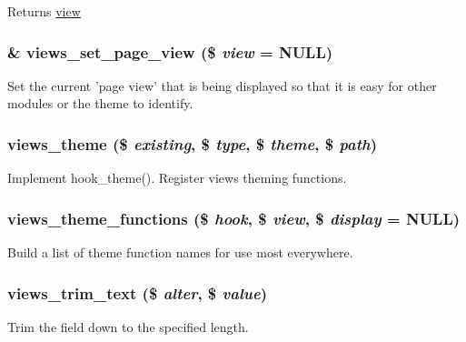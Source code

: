 \begin{DoxyReturn}{Returns}
\hyperlink{classview}{view} 
\end{DoxyReturn}
\hypertarget{views_8module_a71f9684b8a0e7aae0871333881fc06c7}{
\subsubsection[{views\_\-set\_\-page\_\-view}]{\setlength{\rightskip}{0pt plus 5cm}\& views\_\-set\_\-page\_\-view (\$ {\em view} = {\ttfamily NULL})}}
\label{views_8module_a71f9684b8a0e7aae0871333881fc06c7}
Set the current 'page view' that is being displayed so that it is easy for other modules or the theme to identify. \hypertarget{views_8module_aff7ae737313bb2250e6c27f9ca520627}{
\subsubsection[{views\_\-theme}]{\setlength{\rightskip}{0pt plus 5cm}views\_\-theme (\$ {\em existing}, \/  \$ {\em type}, \/  \$ {\em theme}, \/  \$ {\em path})}}
\label{views_8module_aff7ae737313bb2250e6c27f9ca520627}
Implement hook\_\-theme(). Register views theming functions. \hypertarget{views_8module_a5c5e28542b853cf61c0540d05d057e40}{
\subsubsection[{views\_\-theme\_\-functions}]{\setlength{\rightskip}{0pt plus 5cm}views\_\-theme\_\-functions (\$ {\em hook}, \/  \$ {\em view}, \/  \$ {\em display} = {\ttfamily NULL})}}
\label{views_8module_a5c5e28542b853cf61c0540d05d057e40}
Build a list of theme function names for use most everywhere. \hypertarget{views_8module_aa312b055f6206c4ba0c088e60d339d9f}{
\subsubsection[{views\_\-trim\_\-text}]{\setlength{\rightskip}{0pt plus 5cm}views\_\-trim\_\-text (\$ {\em alter}, \/  \$ {\em value})}}
\label{views_8module_aa312b055f6206c4ba0c088e60d339d9f}
Trim the field down to the specified length.


